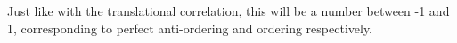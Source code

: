 \documentclass[thesis]{subfiles}
\begin{document}
Just like with the translational correlation, this will be a number between -1 and 1, corresponding to perfect anti-ordering and ordering respectively.

\end{document}

